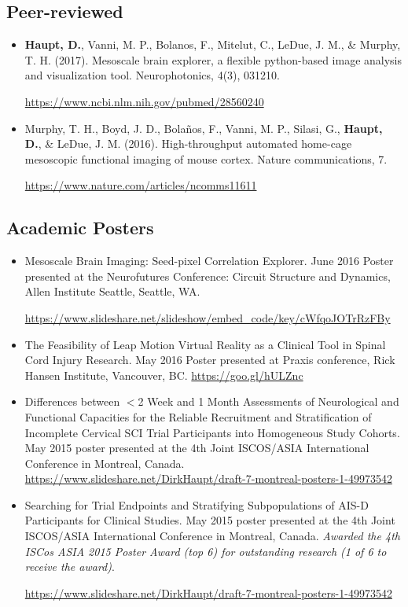 \documentclass[11pt,a4paper,sans]{moderncv}        %
\begin{document}
\subsection{Peer-reviewed}
\begin{itemize}
\item {\textbf{Haupt, D.}, Vanni, M. P., Bolanos, F., Mitelut, C., LeDue, J. M., \& Murphy, T. H. (2017). Mesoscale brain explorer, a flexible python-based image analysis and visualization tool. Neurophotonics, 4(3), 031210. 

\href{https://www.ncbi.nlm.nih.gov/pubmed/28560240}{https://www.ncbi.nlm.nih.gov/pubmed/28560240}}
\item {Murphy, T. H., Boyd, J. D., Bolaños, F., Vanni, M. P., Silasi, G., \textbf{Haupt, D.}, \& LeDue, J. M. (2016). High-throughput automated home-cage mesoscopic functional imaging of mouse cortex. Nature communications, 7. 

\href{https://www.nature.com/articles/ncomms11611}{https://www.nature.com/articles/ncomms11611}}
\end{itemize}
\vspace{5pt}
\subsection{Academic Posters}
\begin{itemize}
\item {Mesoscale Brain Imaging: Seed-pixel Correlation Explorer. June 2016 Poster presented at the Neurofutures Conference: Circuit Structure and Dynamics, Allen Institute Seattle, Seattle,  WA.

\href{https://www.slideshare.net/slideshow/embed\_code/key/cWfqoJOTrRzFBy}{https://www.slideshare.net/slideshow/embed\_code/key/cWfqoJOTrRzFBy}}
\item {The Feasibility of Leap Motion Virtual Reality as a Clinical Tool in Spinal Cord Injury Research. May 2016 Poster presented at Praxis conference, Rick Hansen Institute, Vancouver, BC. \href{https://goo.gl/hULZnc}{https://goo.gl/hULZnc}}
\item {Differences between $<$2 Week and 1 Month Assessments of Neurological and Functional Capacities for the Reliable Recruitment and Stratification of Incomplete Cervical SCI Trial Participants into Homogeneous Study Cohorts. May 2015 poster presented at the 4th Joint ISCOS/ASIA International Conference in Montreal, Canada. \href{https://www.slideshare.net/DirkHaupt/draft-7-montreal-posters-1-49973542}{https://www.slideshare.net/DirkHaupt/draft-7-montreal-posters-1-49973542}}
\item {Searching for Trial Endpoints and Stratifying Subpopulations of AIS-D Participants for Clinical Studies. May 2015 poster presented at the 4th Joint ISCOS/ASIA International Conference in Montreal, Canada. \textit{Awarded the 4th ISCos ASIA 2015 Poster Award (top 6) for outstanding research (1 of 6 to receive the award)}. 

\href{https://www.slideshare.net/DirkHaupt/draft-7-montreal-posters-1-49973542}{https://www.slideshare.net/DirkHaupt/draft-7-montreal-posters-1-49973542}}
\end{itemize}\vspace{5pt}
\end{document}
